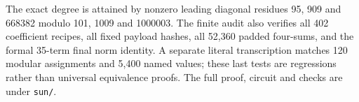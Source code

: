The exact degree is attained by nonzero leading diagonal residues 95,
909 and 668382 modulo 101, 1009 and 1000003. The finite audit also verifies
all 402 coefficient recipes, all fixed payload hashes, all 52,360 padded
four-sums, and the formal 35-term final norm identity. A separate literal
transcription matches 120 modular assignments and 5,400 named values;
these last tests are regressions rather than universal equivalence proofs.
The full proof, circuit and checks are under \texttt{sun/}.
